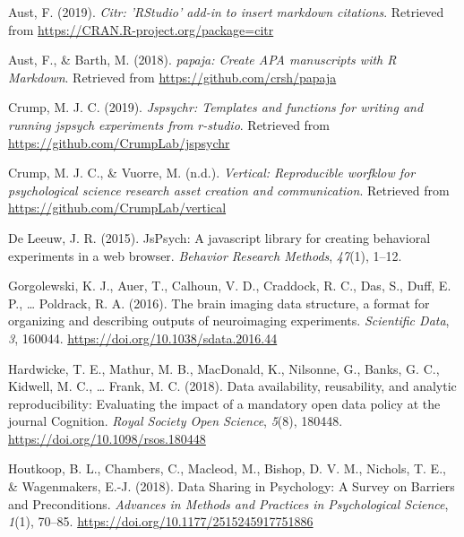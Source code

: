 \documentclass[
  english,
  jou,floatsintext]{apa6}
\newlength{\cslhangindent}
\newenvironment{cslreferences}%
  {\setlength{\parindent}{0pt}%
  \everypar{\setlength{\hangindent}{\cslhangindent}}\ignorespaces}%
  {\par}
\begin{document}
\hypertarget{refs}{}
\begin{cslreferences}
\leavevmode\hypertarget{ref-R-citr}{}%
Aust, F. (2019). \emph{Citr: 'RStudio' add-in to insert markdown citations}. Retrieved from \url{https://CRAN.R-project.org/package=citr}

\leavevmode\hypertarget{ref-R-papaja}{}%
Aust, F., \& Barth, M. (2018). \emph{papaja: Create APA manuscripts with R Markdown}. Retrieved from \url{https://github.com/crsh/papaja}

\leavevmode\hypertarget{ref-R-jspsychr}{}%
Crump, M. J. C. (2019). \emph{Jspsychr: Templates and functions for writing and running jspsych experiments from r-studio}. Retrieved from \url{https://github.com/CrumpLab/jspsychr}

\leavevmode\hypertarget{ref-R-vertical}{}%
Crump, M. J. C., \& Vuorre, M. (n.d.). \emph{Vertical: Reproducible worfklow for psychological science research asset creation and communication}. Retrieved from \url{https://github.com/CrumpLab/vertical}

\leavevmode\hypertarget{ref-de2015jspsych}{}%
De Leeuw, J. R. (2015). JsPsych: A javascript library for creating behavioral experiments in a web browser. \emph{Behavior Research Methods}, \emph{47}(1), 1--12.

\leavevmode\hypertarget{ref-gorgolewski_brain_2016}{}%
Gorgolewski, K. J., Auer, T., Calhoun, V. D., Craddock, R. C., Das, S., Duff, E. P., \ldots{} Poldrack, R. A. (2016). The brain imaging data structure, a format for organizing and describing outputs of neuroimaging experiments. \emph{Scientific Data}, \emph{3}, 160044. \url{https://doi.org/10.1038/sdata.2016.44}

\leavevmode\hypertarget{ref-HardwickeDataavailabilityreusability2018}{}%
Hardwicke, T. E., Mathur, M. B., MacDonald, K., Nilsonne, G., Banks, G. C., Kidwell, M. C., \ldots{} Frank, M. C. (2018). Data availability, reusability, and analytic reproducibility: Evaluating the impact of a mandatory open data policy at the journal Cognition. \emph{Royal Society Open Science}, \emph{5}(8), 180448. \url{https://doi.org/10.1098/rsos.180448}

\leavevmode\hypertarget{ref-HoutkoopDataSharingPsychology2018}{}%
Houtkoop, B. L., Chambers, C., Macleod, M., Bishop, D. V. M., Nichols, T. E., \& Wagenmakers, E.-J. (2018). Data Sharing in Psychology: A Survey on Barriers and Preconditions. \emph{Advances in Methods and Practices in Psychological Science}, \emph{1}(1), 70--85. \url{https://doi.org/10.1177/2515245917751886}


\end{cslreferences}
\end{document}

